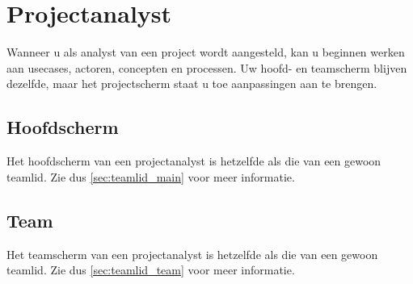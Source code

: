 \documentclass[a4paper,11pt]{article}
\begin{document}
\section{Projectanalyst}
\label{sec:projectlid}

Wanneer u als analyst van een project wordt aangesteld, kan u beginnen werken aan usecases, actoren, concepten en processen. Uw hoofd- en teamscherm blijven dezelfde, maar het projectscherm staat u toe aanpassingen aan te brengen.

\subsection{Hoofdscherm}
\label{sec:projectlid_main}
Het hoofdscherm van een projectanalyst is hetzelfde als die van een gewoon teamlid. Zie dus  \autoref{sec:teamlid_main} voor meer informatie.

\subsection{Team}
\label{sec:projectlid_team}
Het teamscherm van een projectanalyst is hetzelfde als die van een gewoon teamlid. Zie dus  \autoref{sec:teamlid_team} voor meer informatie.
\end{document}
